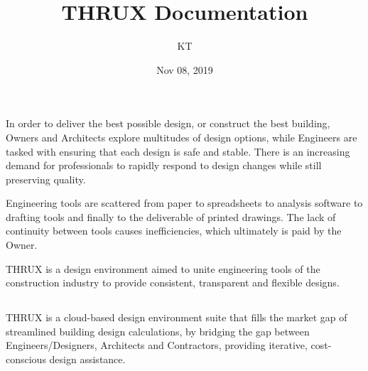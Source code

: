 \documentclass[letterpaper,10pt,english]{sphinxmanual}
\title{THRUX Documentation}
\date{Nov 08, 2019}
\author{KT}
\begin{document}
\pagestyle{empty}
\sphinxmaketitle
\pagestyle{plain}
\sphinxtableofcontents
\pagestyle{normal}
\label{\detokenize{docs/index::doc}}



\chapter{}
\label{\detokenize{docs/introduction/index-thrux:introduction}}\label{\detokenize{docs/introduction/index-thrux::doc}}
In order to deliver the best possible design, or construct the best building, Owners and Architects explore multitudes of design options, while Engineers are tasked with ensuring that each design is safe and stable.  There is an increasing demand for professionals to rapidly respond to design changes while still preserving quality.

Engineering tools are scattered from paper to spreadsheets to analysis software to drafting tools and finally to the deliverable of printed drawings.  The lack of continuity between tools causes inefficiencies, which ultimately is paid by the Owner.

THRUX is a design environment aimed to unite engineering tools of the construction industry to provide consistent, transparent and flexible designs.


\section{}
\label{\detokenize{docs/introduction/index-thrux:what-is-thrux}}
THRUX is a cloud-based design environment suite that fills the market gap of streamlined building design calculations, by bridging the gap between Engineers/Designers, Architects and Contractors, providing iterative, cost-conscious design assistance.
\end{document}
